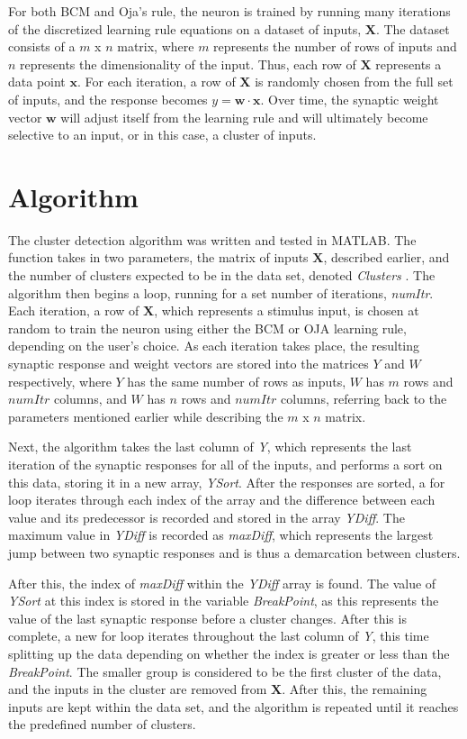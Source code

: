\documentclass[10pt,twoside]{article}
\begin{document}
For both BCM and Oja's rule, the neuron is trained by running many
iterations of the discretized learning rule equations on a dataset of inputs, $\mathbf{X}$. The dataset 
consists of a $m$ x $n$ matrix, where $m$ represents the number of rows of inputs and
$n$ represents the dimensionality of the input. Thus, each row of $\mathbf{X}$ represents a data point $\mathbf{x}$. For each iteration,
a row of $\mathbf{X}$  is randomly chosen from the full set of inputs, and
the response becomes $y = \mathbf{w} \cdot \mathbf{x}$. Over time, the synaptic weight 
vector $\mathbf{w}$ will adjust itself from the learning rule and will 
ultimately become selective to an input, or in this case, a
cluster of inputs.

\section*{\centering Algorithm}

The cluster detection algorithm was written and tested in MATLAB.
The function takes in two parameters, the matrix of inputs $\mathbf{X}$, described earlier, and the
number of clusters expected to be in the data set, denoted {\it Clusters \/}. The algorithm 
then begins a loop, running for a set number of iterations, {\it numItr\/}. Each iteration, 
a row of $\mathbf{X}$, which represents a stimulus input, is chosen at random to train the neuron using either the BCM 
or OJA learning rule, depending on the user's choice. As each iteration takes place, the resulting synaptic response and weight vectors
are stored into the matrices $Y$ and $W$ respectively, where $Y$ has the same number of rows as inputs, $W$ has $m$ rows and $numItr$ columns, and $W$ has $n$ rows and $numItr$ columns, referring back to the parameters mentioned earlier while describing the $m$ x $n$ matrix.

Next, the algorithm takes the last column of {\it Y\/}, which represents the last 
iteration of the synaptic responses for all of the inputs, and performs a sort 
on this data, storing it in a new array, {\it YSort\/}. After the responses 
are sorted, a for loop iterates through each index of the array and the difference
between each value and its predecessor is recorded and stored 
in the array {\it YDiff\/}. The maximum value in {\it YDiff\/} is recorded as {\it maxDiff\/}, which represents the largest jump
between two synaptic responses and is thus a demarcation between clusters. 

After this, the index of {\it maxDiff\/} within the {\it YDiff\/} array is found. The value 
of {\it YSort\/} at this index is stored in the variable {\it BreakPoint\/}, as this represents
the value of the last synaptic response before a cluster changes. After this is complete, 
a new for loop iterates throughout the last column of {\it Y\/}, this time splitting up the data 
depending on whether the index is greater or less than the {\it BreakPoint\/}. The smaller
group is considered to be the first cluster of the data, and the inputs in the 
cluster are removed from $\mathbf{X}$. After this, the remaining inputs are
kept within the data set, and the algorithm is repeated until it reaches the predefined number of clusters. 
\end{document}
